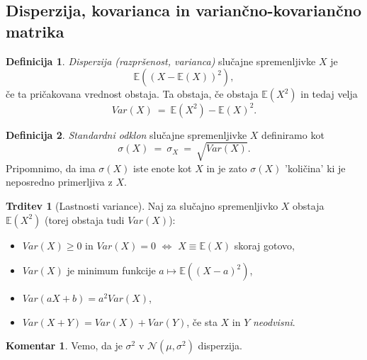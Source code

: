 \documentclass[11pt]{article}
\newcommand{\E}{\mathbb{E}}
\newcommand{\1}{\mathbbm{1}}
\newcommand{\n}{\mathcal{N}}
\theoremstyle{definition}
\newtheorem{definicija}{Definicija}[section]
\theoremstyle{definition}
\newtheorem{trditev}{Trditev}[section]
\theoremstyle{definition}
\newtheorem*{komentar}{Komentar}
\begin{document}

\subsection{Disperzija, kovarianca in variančno-kovariančno matrika}
\vspace{0.5cm}

\begin{definicija}

\textit{Disperzija (razpršenost, varianca)} slučajne spremenljivke $X$ je 
$$\E((X - \E(X))^2),$$
če ta pričakovana vrednost obstaja. Ta obstaja, če obstaja $\E(X^2)$ in tedaj velja
$$Var(X) ~=~ \E(X^2) - \E(X)^2.$$

\end{definicija}
\vspace{0.5cm}

\begin{definicija}

\textit{Standardni odklon} slučajne spremenljivke $X$ definiramo kot
$$\sigma(X) ~=~ \sigma_X ~=~ \sqrt{Var(X)}.$$
Pripomnimo, da ima $\sigma(X)$ iste enote kot $X$ in je zato $\sigma(X)$ 'količina' ki je neposredno primerljiva z $X$.

\end{definicija}
\vspace{0.5cm}

\begin{trditev}[Lastnosti variance]

Naj za slučajno spremenljivko $X$ obstaja $\E(X^2)$ (torej obstaja tudi $Var(X)$):
\begin{itemize}
	\item $Var(X) \geq 0$ in $Var(X) = 0$ $\iff$ $X \equiv \E(X)$ skoraj gotovo,
	
	\item $Var(X)$ je minimum funkcije $a \mapsto \E((X-a)^2)$,
	
	\item $Var(aX+b) = a^2 Var(X)$,
	
	\item $Var(X+Y) = Var(X) + Var(Y)$, če sta $X$ in $Y$ \textit{neodvisni}.
\end{itemize}

\end{trditev}
\vspace{0.5cm}

\begin{komentar}

Vemo, da je $\sigma^2$ v $\n(\mu, \sigma^2)$ disperzija.

\end{komentar}
\vspace{0.5cm}
\end{document}

